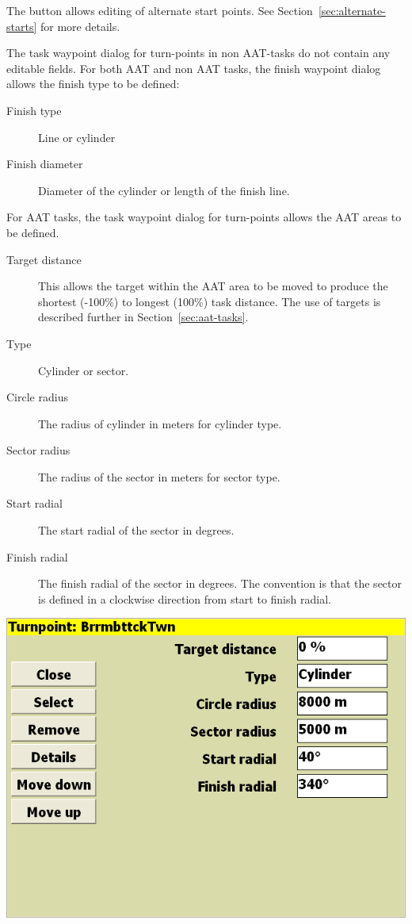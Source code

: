 \documentclass[a4paper,12pt]{refrep}
\begin{document}
The  button allows editing of alternate
start points.  See Section~\ref{sec:alternate-starts} for more
details.

The task waypoint dialog for turn-points in non AAT-tasks do not
contain any editable fields.  For both AAT and non AAT tasks, the
finish waypoint dialog allows the finish type to be defined:
\begin{description}
\item[Finish type] Line or cylinder
\item[Finish diameter] Diameter of the cylinder or length of the finish line.
\end{description}


For AAT tasks, the task waypoint dialog for turn-points allows the AAT
areas to be defined.
\begin{description}
\item[Target distance]  This allows the target within the AAT area to be moved to produce the shortest (-100\%) to longest (100\%) task distance.
The use of targets is described further in Section~\ref{sec:aat-tasks}.
\item[Type] Cylinder or sector.
\item[Circle radius] The radius of cylinder in meters for cylinder type.
\item[Sector radius] The radius of the sector in meters for sector type.
\item[Start radial] The start radial of the sector in degrees.
\item[Finish radial] The finish radial of the sector in degrees.
 The convention is that the sector is defined in a clockwise direction from
  start to finish radial.
\end{description}
\begin{center}
\includegraphics[angle=0,width=\linewidth,keepaspectratio='true']{figures/dialog-taskedit4.png}
\end{center}
\end{document}
